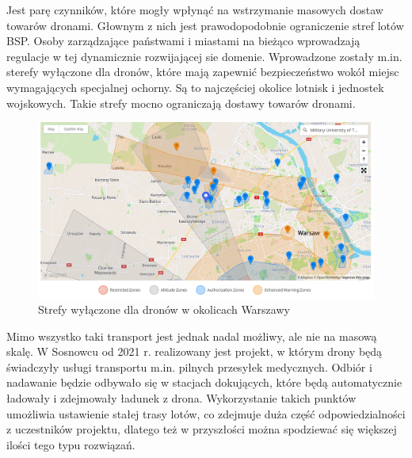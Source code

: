 Jest parę czynników, które mogły wpłynąć na wstrzymanie masowych dostaw towarów dronami. Głownym z nich jest prawodopodobnie ograniczenie stref lotów BSP. Osoby zarządzające państwami i miastami na bieżąco wprowadzają regulacje w tej dynamicznie rozwijającej sie domenie. Wprowadzone zostały m.in. sterefy wyłączone dla dronów, które mają zapewnić bezpieczeństwo wokół miejsc wymagających specjalnej ochorny. Są to najczęściej okolice lotnisk i jednostek wojskowych. Takie strefy mocno ograniczają dostawy towarów dronami.\cite{drone-transport}


\begin{figure}[!ht]
\begin{center}
  \includegraphics[width=16cm]{./Obrazy/no2.png}
  \caption{Strefy wyłączone dla dronów w okolicach Warszawy}
\end{center}
\end{figure}

Mimo wszystko taki transport jest jednak nadal możliwy, ale nie na masową skalę. W Sosnowcu od 2021 r. realizowany jest projekt, w którym drony będą świadczyły usługi transportu m.in. pilnych przesyłek medycznych. Odbiór i nadawanie będzie odbywało się w stacjach dokujących, które będą automatycznie ładowały i zdejmowały ładunek z drona. Wykorzystanie takich punktów umożliwia ustawienie stałej trasy lotów, co zdejmuje duża część odpowiedzialności z uczestników projektu, dlatego też w przyszłości można spodziewać się większej ilości tego typu rozwiązań.\cite{sosnowiec-drone}


